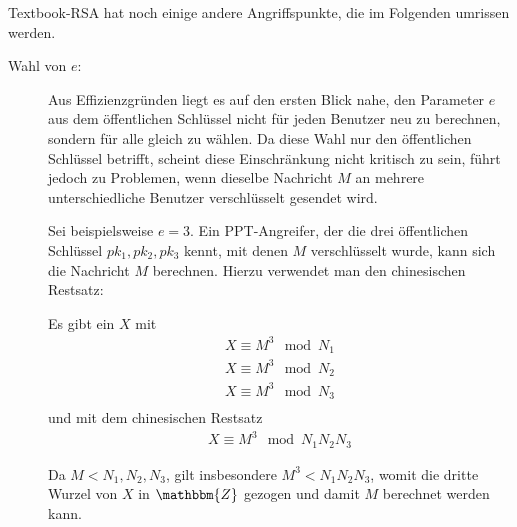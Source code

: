 Textbook-RSA hat noch einige andere
Angriffspunkte, die im Folgenden umrissen werden. 

\begin{description}
\item[Wahl von $e$:] Aus Effizienzgründen liegt es auf den ersten Blick
  nahe, den Parameter $e$ aus dem öffentlichen Schlüssel nicht für jeden
  Benutzer neu zu berechnen, sondern für alle gleich zu wählen. Da diese
  Wahl nur den öffentlichen Schlüssel betrifft, scheint diese
  Einschränkung nicht kritisch zu sein, führt jedoch zu Problemen, wenn
  dieselbe Nachricht $M$ an mehrere unterschiedliche Benutzer
  verschlüsselt gesendet wird. 
  
  Sei beispielsweise $e=3$. Ein PPT-Angreifer, der die drei öffentlichen
  Schlüssel $pk_1, pk_2, pk_3$ kennt, mit denen $M$ verschlüsselt wurde,
  kann sich die Nachricht $M$ berechnen. Hierzu verwendet man den
  chinesischen Restsatz:

  Es gibt ein $X$ mit
  \begin{align*}
    X \equiv M^3 \mod N_1\\
    X \equiv M^3 \mod N_2\\
    X \equiv M^3 \mod N_3\\
  \end{align*}
  und mit dem chinesischen Restsatz
  \begin{align*}
    X \equiv M^3 \mod N_1N_2N_3
  \end{align*}

Da $M < N_1, N_2, N_3$, gilt insbesondere $M^3<N_1N_2N_3$, womit die dritte Wurzel von $X$ in $\mathbbm{Z}$
gezogen und damit $M$ berechnet werden kann.
    

\end{description}
